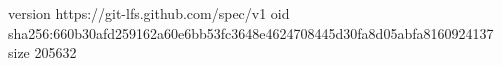 version https://git-lfs.github.com/spec/v1
oid sha256:660b30afd259162a60e6bb53fc3648e4624708445d30fa8d05abfa8160924137
size 205632
